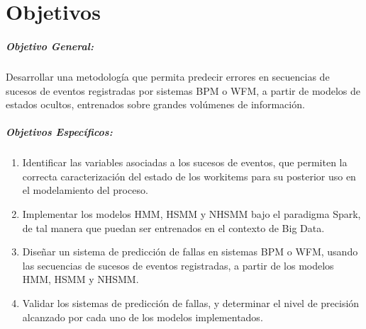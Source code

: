 
\chapter*{Objetivos} 

\paragraph{Objetivo General:}

Desarrollar una metodología que permita predecir errores en secuencias de sucesos de eventos registradas por sistemas BPM o WFM,  a partir de modelos de estados ocultos, entrenados sobre grandes volúmenes de información.

\paragraph{Objetivos Específicos:}

\begin{enumerate}
\item Identificar las variables asociadas a los sucesos de eventos, que permiten la correcta caracterización del estado de los workitems para su posterior uso en el modelamiento del proceso.
\item Implementar los modelos HMM, HSMM y NHSMM bajo el paradigma Spark, de tal manera que puedan ser entrenados en el contexto de Big Data.
\item Diseñar un sistema de predicción de fallas en sistemas BPM o WFM, usando las secuencias de sucesos de eventos registradas, a partir de los modelos HMM, HSMM y NHSMM.
\item Validar los sistemas de predicción de fallas, y determinar el nivel de precisión alcanzado por cada uno de los modelos implementados.
\end{enumerate}